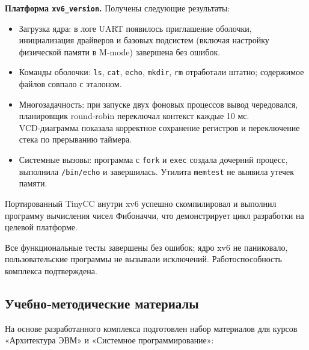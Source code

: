 \textbf{Платформа \texttt{xv6\_version}.} Получены следующие результаты:
\begin{itemize}
\item Загрузка ядра: в логе UART появилось приглашение оболочки, инициализация драйверов и базовых подсистем (включая настройку физической памяти в M‑mode) завершена без ошибок.
\item Команды оболочки: \texttt{ls}, \texttt{cat}, \texttt{echo}, \texttt{mkdir}, \texttt{rm} отработали штатно; содержимое файлов совпало с эталоном.
\item Многозадачность: при запуске двух фоновых процессов вывод чередовался, планировщик round‑robin переключал контекст каждые 10 мс. VCD‑диаграмма показала корректное сохранение регистров и переключение стека по прерыванию таймера.
\item Системные вызовы: программа с \texttt{fork} и \texttt{exec} создала дочерний процесс, выполнила \texttt{/bin/echo} и завершилась. Утилита \texttt{memtest} не выявила утечек памяти.
\end{itemize}
Портированный TinyCC внутри xv6 успешно скомпилировал и выполнил программу вычисления чисел Фибоначчи, что демонстрирует цикл разработки на целевой платформе.

Все функциональные тесты завершены без ошибок; ядро xv6 не паниковало, пользовательские программы не вызывали исключений. Работоспособность комплекса подтверждена.

\subsection{Учебно‑методические материалы}

На основе разработанного комплекса подготовлен набор материалов для курсов «Архитектура ЭВМ» и «Системное программирование»:

